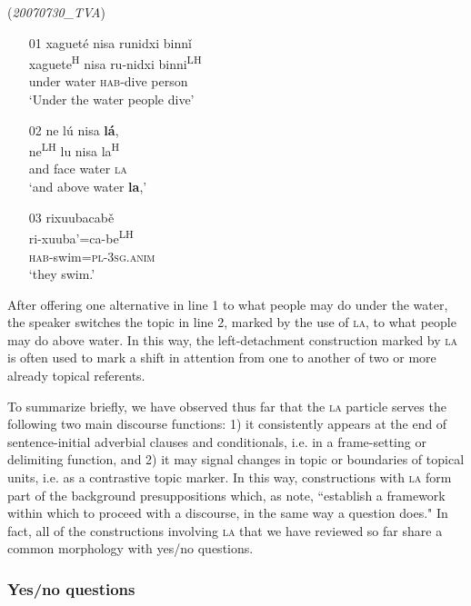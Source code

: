 \ea\label{alternatives2} (\textit{20070730{\_}TVA})
\begin{itemize}
\item[01]
\glll xaguet\'{e} nisa runidxi binn\v{i}  \\
xaguete\textsuperscript{H} nisa ru-nidxi binni\textsuperscript{LH}  \\
under water \textsc{hab}-dive person  \\
\glt `Under the water people dive'


\item[02]
\glll ne l\'{u} nisa \textbf{l\'{a}}, \\
ne\textsuperscript{LH} lu nisa la\textsuperscript{H}  \\
and face water \textsc{la}  \\
\glt `and above water \textbf{la},'


\item[03]
\glll rixuubacab\v{e} \\
ri-xuuba'=ca-be\textsuperscript{LH}  \\
\textsc{hab}-swim=\textsc{pl}-3\textsc{sg.anim}  \\
\glt `they swim.' 

\end{itemize}
\z
After offering one alternative in line 1 to what people may do under the water, the speaker switches the topic in line 2, marked by the use of \textsc{la}, to what people may do above water. In this way, the left-detachment construction marked by \textsc{la} is often used to mark a shift in attention from one to another of two or more already topical referents. 

To summarize briefly, we have observed thus far that the \textsc{la} particle serves the following two main discourse functions: 1) it consistently appears at the end of sentence-initial adverbial clauses and conditionals, i.e. in a frame-setting or delimiting function, and 2) it may signal changes in topic or boundaries of topical units, i.e. as a contrastive topic marker. In this way, constructions with \textsc{la} form part of the background presuppositions which, as \citet[292]{thompson2007} note, ``establish a framework within which to proceed with a discourse, in the same way a question does." In fact, all of the constructions involving \textsc{la} that we have reviewed so far share a common morphology with yes/no questions. 


\subsubsection{Yes/no questions}

